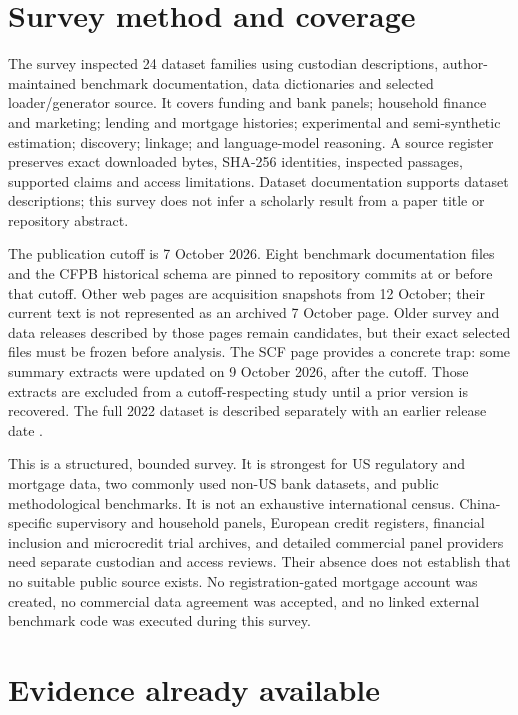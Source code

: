 \hypertarget{survey-method-and-coverage}{%
\section{Survey method and coverage}\label{survey-method-and-coverage}}

The survey inspected 24 dataset families using custodian descriptions,
author-maintained benchmark documentation, data dictionaries and
selected loader/generator source. It covers funding and bank panels;
household finance and marketing; lending and mortgage histories;
experimental and semi-synthetic estimation; discovery; linkage; and
language-model reasoning. A source register preserves exact downloaded
bytes, SHA-256 identities, inspected passages, supported claims and
access limitations. Dataset documentation supports dataset descriptions;
this survey does not infer a scholarly result from a paper title or
repository abstract.

The publication cutoff is 7 October 2026. Eight benchmark documentation
files and the CFPB historical schema are pinned to repository commits at
or before that cutoff. Other web pages are acquisition snapshots from 12
October; their current text is not represented as an archived 7 October
page. Older survey and data releases described by those pages remain
candidates, but their exact selected files must be frozen before
analysis. The SCF page provides a concrete trap: some summary extracts
were updated on 9 October 2026, after the cutoff. Those extracts are
excluded from a cutoff-respecting study until a prior version is
recovered. The full 2022 dataset is described separately with an earlier
release date \citep{pd15_scf}.

This is a structured, bounded survey. It is strongest for US regulatory
and mortgage data, two commonly used non-US bank datasets, and public
methodological benchmarks. It is not an exhaustive international census.
China-specific supervisory and household panels, European credit
registers, financial inclusion and microcredit trial archives, and
detailed commercial panel providers need separate custodian and access
reviews. Their absence does not establish that no suitable public source
exists. No registration-gated mortgage account was created, no
commercial data agreement was accepted, and no linked external benchmark
code was executed during this survey.

\hypertarget{evidence-already-available}{%
\section{Evidence already available}\label{evidence-already-available}}

